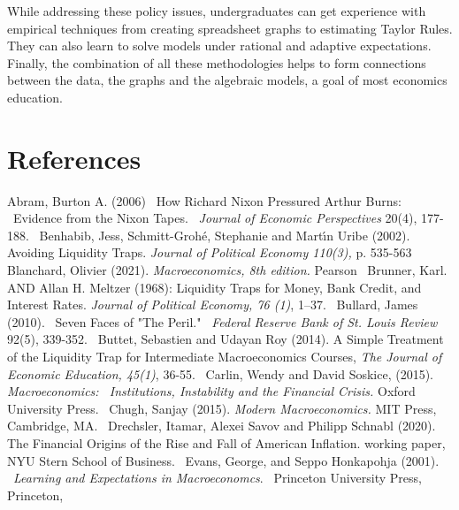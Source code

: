 \documentclass{article}
\begin{document}
\begin{doublespace}
While addressing these policy issues, undergraduates can get experience with
empirical techniques from creating spreadsheet graphs to estimating Taylor
Rules. They can also learn to solve models under rational and adaptive
expectations. Finally, the combination of all these methodologies helps to
form connections between the data, the graphs and the algebraic models, a
goal of most economics education.\bigskip

\section{References}

\newline
Abram, Burton A. (2006) \ How Richard Nixon Pressured Arthur Burns: \
Evidence from the Nixon Tapes. \ \textit{Journal of Economic Perspectives }%
20(4), 177-188.\bigskip\ \newline
Benhabib, Jess, Schmitt-Groh\'{e}, Stephanie and Mart\'{\i}n Uribe (2002).
Avoiding Liquidity Traps. \textit{Journal of Political Economy 110(3), }p.
535-563\bigskip\ \newline
Blanchard, Olivier (2021). \textit{Macroeconomics, 8th edition.}
Pearson\bigskip\ \newline
Brunner, Karl. AND Allan H. Meltzer (1968): Liquidity Traps for Money, Bank
Credit, and Interest Rates. \textit{Journal of Political Economy, 76 (1)},
1--37.\bigskip\ \newline
Bullard, James (2010). \ Seven Faces of "The Peril." \textit{\ Federal
Reserve Bank of St. Louis Review} 92(5), 339-352.\bigskip\ \newline
Buttet, Sebastien and Udayan Roy (2014). A Simple Treatment of the Liquidity
Trap for Intermediate Macroeconomics Courses, \textit{The Journal of
Economic Education, 45(1)}, 36-55.\bigskip\ \newline
Carlin, Wendy and David Soskice, (2015). \textit{Macroeconomics: \
Institutions, Instability and the Financial Crisis.} Oxford University
Press.\bigskip\ \newline
Chugh, Sanjay (2015). \textit{Modern Macroeconomics.} MIT Press, Cambridge,
MA.\bigskip\ \newline
Drechsler, Itamar, Alexei Savov and Philipp Schnabl (2020). The Financial
Origins of the Rise and Fall of American Inflation. working paper, NYU Stern
School of Business.\bigskip\ \newline
Evans, George, and Seppo Honkapohja (2001). \ \textit{Learning and
Expectations in Macroeconomcs}. \ Princeton University Press, Princeton,

\end{doublespace}
\end{document}
